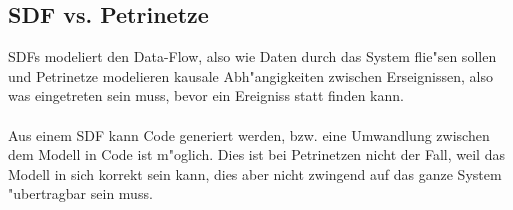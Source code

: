 \documentclass{article}
\begin{document}
\subsection{SDF vs. Petrinetze}
SDFs modeliert den Data-Flow, also wie Daten durch das System flie"sen sollen
    und Petrinetze modelieren kausale Abh"angigkeiten zwischen Erseignissen,
    also was eingetreten sein muss, bevor ein Ereigniss statt finden kann.\\
\\
Aus einem SDF kann Code generiert werden, bzw. eine Umwandlung zwischen dem
    Modell in Code ist m"oglich. Dies ist bei Petrinetzen nicht der Fall, weil
    das Modell in sich korrekt sein kann, dies aber nicht zwingend auf das 
    ganze System "ubertragbar sein muss.\\
\end{document}
